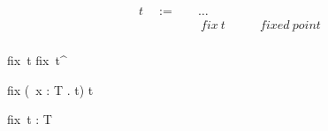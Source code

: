 
\begin{frame}
  \begin{mdframed}[frametitle={Terms}]
\begin{displaymath}
    \begin{aligned}
t \quad:=\quad& \ldots &\\
  & ~ fix~t \quad\quad &fixed~point\\
    \end{aligned}
\end{displaymath}
  \end{mdframed}
\end{frame}

\begin{frame}
  \begin{mdframed}[frametitle={Small-step semantics}]

  {fix~t \longrightarrow fix~t^{\prime}}

  \infrule[E-FixBeta]
  {}
  {fix
    \left(\lambda~x {:} T . t\right)
    \longrightarrow {}t}

  \end{mdframed}
\end{frame}

\begin{frame}
  \begin{mdframed}[frametitle={Typing rules}]

  {\vdash fix~t {:} T}

  \end{mdframed}
\end{frame}
